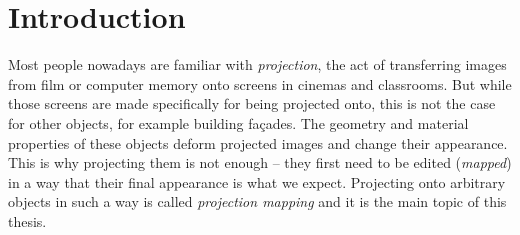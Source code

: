 \chapter{Introduction}
\label{chapter:intro}

Most people nowadays are familiar with \textit{projection}, the act of transferring images from film or computer memory onto screens in cinemas and classrooms. But while those screens are made specifically for being projected onto, this is not the case for other objects, for example building façades. The geometry and material properties of these objects deform projected images and change their appearance. This is why projecting them is not enough -- they first need to be edited (\textit{mapped}) in a way that their final appearance is what we expect. Projecting onto arbitrary objects in such a way is called \textit{projection mapping} and it is the main topic of this thesis.

